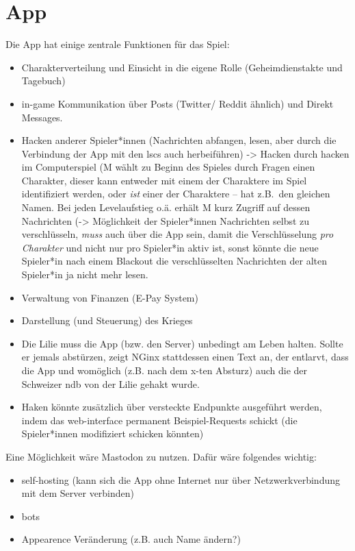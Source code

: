 \section{App} 
Die App hat einige zentrale Funktionen für das Spiel:
\begin{itemize}
  \item Charakterverteilung und Einsicht in die eigene Rolle (Geheimdienstakte
    und Tagebuch)
  \item in-game Kommunikation über Posts (Twitter/ Reddit ähnlich) und Direkt
    Messages. 
  \item Hacken anderer Spieler*innen (Nachrichten abfangen, lesen, aber durch
    die Verbindung der App mit den \ac{lsc}s auch 
    herbeiführen) -> Hacken durch hacken im Computerspiel (M wählt zu Beginn des
    Spieles durch Fragen einen Charakter, dieser kann entweder mit einem der
    Charaktere im Spiel identifiziert werden, oder \emph{ist} einer der
    Charaktere -- hat z.B.~den gleichen Namen. Bei jeden Levelaufstieg o.ä.
    erhält M kurz Zugriff auf dessen Nachrichten (-> Möglichkeit der
    Spieler*innen Nachrichten selbst zu verschlüsseln, \emph{muss} auch über die
    App sein, damit die Verschlüsselung \emph{pro Charakter} und nicht nur pro
    Spieler*in aktiv ist, sonst könnte die neue Spieler*in nach einem Blackout
    die verschlüsselten Nachrichten der alten Spieler*in ja nicht mehr lesen.
  \item Verwaltung von Finanzen (E-Pay System)
  \item Darstellung (und Steuerung) des Krieges
  \item Die Lilie muss die App (bzw. den Server) unbedingt am Leben halten.
    Sollte er jemals abstürzen, zeigt NGinx stattdessen einen Text an, der
    entlarvt, dass die App und womöglich (z.B. nach dem x-ten Absturz) auch die
    der Schweizer \ac{ndb} von der Lilie gehakt wurde.
  \item Haken könnte zusätzlich über versteckte Endpunkte ausgeführt werden,
    indem das web-interface permanent Beispiel-Requests schickt (die
    Spieler*innen modifiziert schicken könnten)
\end{itemize}

Eine Möglichkeit wäre Mastodon zu nutzen. Dafür wäre folgendes wichtig: 
\begin{itemize}
  \item self-hosting (kann sich die App ohne Internet nur über
    Netzwerkverbindung mit dem Server verbinden) 
  \item bots 
  \item Appearence Veränderung (z.B. auch Name ändern?)
\end{itemize}


